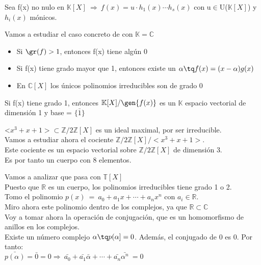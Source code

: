 \documentclass[nochap]{apuntes}
\begin{document}
\begin{theorem}
 Sea f(x) no nulo en $\mathbb{K}[X] \ \Rightarrow \ f(x)=u\cdot h_1(x) \cdots h_s(x)$  con u$\in$U($\mathbb{K}[X]$)  y $h_i(x)$  mónicos.
\end{theorem}

\begin{example}
 Vamos a estudiar el caso concreto de con $\mathbb{K}=\mathbb{C}$\\
 \begin{itemize}
  \item Si $\gr(f)>1$, entonces f(x) tiene algún 0
  \item Si f(x) tiene grado mayor que 1, entonces existe un $\alpha \tq f(x)=(x-\alpha)g(x)$
  \item En $\mathbb{C}[X]$  los únicos polinomios irreducibles son de grado 0
 \end{itemize}
\end{example}

\begin{lemma}
 Si f(x) tiene grado 1, entonces $\mathbb{K}[X]/\gen{f(x)}$  es un $\mathbb{K}$  espacio vectorial de dimensión 1 y base = $\{\bar{1}\}$
\end{lemma}

\begin{example}
 <$x^3+x+1>\subset \mathbb{Z}/2\mathbb{Z}[X]$  es un ideal maximal, por ser irreducible.\\
 Vamos a estudiar ahora el cociente $\mathbb{Z}/2\mathbb{Z}[X]/<x^3+x+1>$.\\
 Este cociente es un espacio vectorial sobre $\mathbb{Z}/2\mathbb{Z}[X]$  de dimensión 3.\\
 Es por tanto un cuerpo con 8 elementos.
\end{example}

Vamos a analizar que pasa con $\mathbb{T}[X]$\\

Puesto que $\mathbb{R}$  es un cuerpo, los polinomios irreducibles tiene grado 1 o 2.\\
Tomo el polinomio $p(x) \ = \ a_0+a_1x+\cdots + a_n x^{n}$  con $a_i\in \mathbb{R}$.\\

Miro ahora este polinomio dentro de los complejos, ya que $\mathbb{R}\subset \mathbb{C}$\\
Voy a tomar ahora la operación de conjugación, que es un homomorfismo de anillos en los complejos.\\

Existe un número complejo $\alpha \tq p(\alpha]=0$. Además, el conjugado de 0 es 0. Por tanto:\\
$\bar{p(\alpha)}=\bar{0}=0 \Rightarrow \ \bar{a_0}+\bar{a_1}\bar{\alpha}+\cdots + \bar{a_n}\bar{\alpha^{n}} \ = 0$\\
\end{document}
